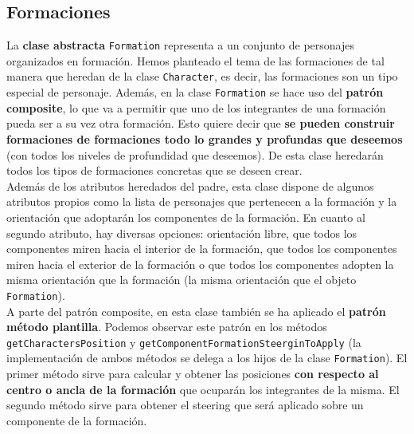 \subsection{Formaciones}
\label{formaciones}

La \textbf{clase abstracta} \texttt{Formation} representa a un conjunto de personajes organizados en formación. Hemos planteado el tema de las formaciones de tal manera que heredan de la clase \texttt{Character}, es decir, las formaciones son un tipo especial de personaje. Además, en la clase \texttt{Formation} se hace uso del \textbf{patrón composite}, lo que va a permitir que uno de los integrantes de una formación pueda ser a su vez otra formación. Esto quiere decir que \textbf{se pueden construir formaciones de formaciones todo lo grandes y profundas que deseemos} (con todos los niveles de profundidad que deseemos). De esta clase heredarán todos los tipos de formaciones concretas que se deseen crear. \\

Además de los atributos heredados del padre, esta clase dispone de algunos atributos propios como la lista de personajes que pertenecen a la formación y la orientación que adoptarán los componentes de la formación. En cuanto al segundo atributo, hay diversas opciones: orientación libre, que todos los componentes miren hacia el interior de la formación, que todos los componentes miren hacia el exterior de la formación o que todos los componentes adopten la misma orientación que la formación (la misma orientación que el objeto \texttt{Formation}). \\

A parte del patrón composite, en esta clase también se ha aplicado el \textbf{patrón método plantilla}. Podemos observar este patrón en los métodos \texttt{getCharactersPosition} y \texttt{getComponentFormationSteerginToApply} (la implementación de ambos métodos se delega a los hijos de la clase \texttt{Formation}). El primer método sirve para calcular y obtener las posiciones \textbf{con respecto al centro o ancla de la formación} que ocuparán los integrantes de la misma. El segundo método sirve para obtener el steering que será aplicado sobre un componente de la formación. \\

